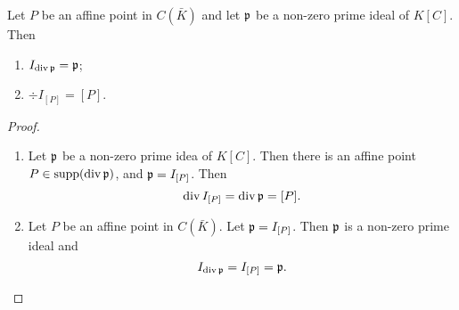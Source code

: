 \begin{proposition}
  Let $P$ be an affine point in $C(\bar K)$ and let $\frak p$ be a non-zero prime ideal of $K[C]$. Then
  \begin{enumerate}[label=(\roman*)]
    \item $I_{\div \frak p} = \frak p$;
    \item $\div I_{[P]} = [P]$.
  \end{enumerate}
\end{proposition}
\begin{proof}
  \begin{enumerate}[label=(\roman*)]
    \item
      Let $\frak p$ be a non-zero prime idea of $K[C]$.
      Then there is an affine point $P \in \supp(\div \frak p)$,
      and $\frak p = I_{[P]}$. Then
      \[ \div I_{[P]} = \div \frak p = [P]. \]
    
    \item
      Let $P$ be an affine point in $C(\bar K)$.
      Let $\frak p = I_{[P]}$. Then $\frak p$ is a non-zero prime ideal and
      \[ I_{\div \frak p} = I_{[P]} = \frak p. \]
  \end{enumerate}
\end{proof}

